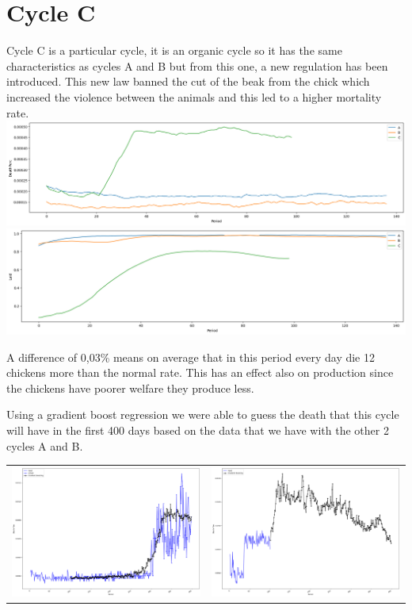 \documentclass[11pt]{article}
\begin{document}
\section{Cycle C}
Cycle C is a particular cycle, it is an organic cycle so it has the same characteristics as cycles A and B but from this one, a new regulation has been introduced. This new law banned the cut of the beak from the chick which increased the violence between the animals and this led to a higher mortality rate.\\
\includegraphics[width=\linewidth]{../Results/Comp_AB_C/Death.png}
\includegraphics[width=\linewidth]{../Results/Comp_AB_C/Laid.png}

A difference of 0,03\% means on average that in this period every day die 12 chickens more than the normal rate.
This has an effect also on production since the chickens have poorer welfare they produce less.

Using a gradient boost regression we were able to guess the death that this cycle will have in the first 400 days based on the data that we have with the other 2 cycles A and B.
\newline
\begin{tabular}{c c}
    \includegraphics[width=70mm]{../Results/Comp_AB_C/predictor.png} &
    \includegraphics[width=70mm]{../Results/Comp_AB_C/predicted.png}
\end{tabular}
\end{document}
